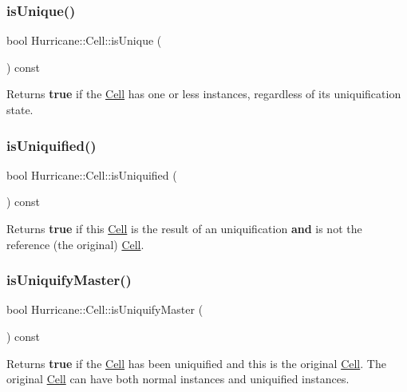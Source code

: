 \subsubsection{\texorpdfstring{is\+Unique()}{isUnique()}}
{\footnotesize\ttfamily bool Hurricane\+::\+Cell\+::is\+Unique (\begin{DoxyParamCaption}{ }\end{DoxyParamCaption}) const}

Returns {\bfseries true} if the \mbox{\hyperlink{classHurricane_1_1Cell}{Cell}} has one or less instances, regardless of it\textquotesingle{}s uniquification state. \mbox{\label{classHurricane_1_1Cell_a86c21867e9ce896eae72fd2999ce8a2d}} 
\subsubsection{\texorpdfstring{is\+Uniquified()}{isUniquified()}}
{\footnotesize\ttfamily bool Hurricane\+::\+Cell\+::is\+Uniquified (\begin{DoxyParamCaption}{ }\end{DoxyParamCaption}) const}

Returns {\bfseries true} if this \mbox{\hyperlink{classHurricane_1_1Cell}{Cell}} is the result of an uniquification {\bfseries and} is not the reference (the original) \mbox{\hyperlink{classHurricane_1_1Cell}{Cell}}. \mbox{\label{classHurricane_1_1Cell_a0220dbbbe730e6874f7620135e9c10f6}} 
\subsubsection{\texorpdfstring{is\+Uniquify\+Master()}{isUniquifyMaster()}}
{\footnotesize\ttfamily bool Hurricane\+::\+Cell\+::is\+Uniquify\+Master (\begin{DoxyParamCaption}{ }\end{DoxyParamCaption}) const}

Returns {\bfseries true} if the \mbox{\hyperlink{classHurricane_1_1Cell}{Cell}} has been uniquified and this is the original \mbox{\hyperlink{classHurricane_1_1Cell}{Cell}}. The original \mbox{\hyperlink{classHurricane_1_1Cell}{Cell}} can have both normal instances and uniquified instances. \mbox{\label{classHurricane_1_1Cell_ad2c9face922062664110c66ee205eab2}} 
